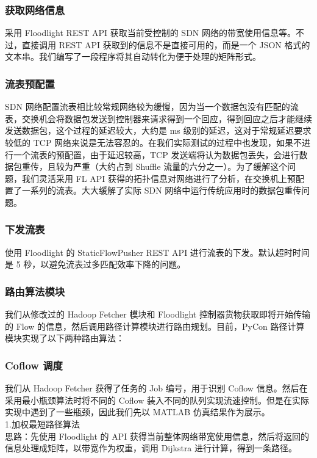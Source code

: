 \documentclass[a4paper, 11pt]{article}                                                   %
\begin{document}
\begin{CJK*}{UTF8}{song}
\subsubsection{获取网络信息}
采用 Floodlight REST API 获取当前受控制的 SDN 网络的带宽使用信息等。不过，直接调用 REST API 获取到的信息不是直接可用的，而是一个 JSON 格式的文本串。我们编写了一段程序将其自动转化为便于处理的矩阵形式。

\subsubsection{流表预配置}
SDN 网络配置流表相比较常规网络较为缓慢，因为当一个数据包没有匹配的流表，交换机会将数据包发送到控制器来请求得到一个回应，得到回应之后才能继续发送数据包，这个过程的延迟较大，大约是 ms 级别的延迟，这对于常规延迟要求较低的 TCP 网络来说是无法容忍的。在我们实际测试的过程中也发现，如果不进行一个流表的预配置，由于延迟较高，TCP 发送端将认为数据包丢失，会进行数据包重传，且较为严重（大约占到 Shuffle 流量的六分之一）。为了缓解这个问题，我们灵活采用 FL API 获得的拓扑信息对网络进行了分析，在交换机上预配置了一系列的流表。大大缓解了实际 SDN 网络中运行传统应用时的数据包重传问题。

\subsubsection{下发流表}
使用 Floodlight 的 StaticFlowPusher REST API 进行流表的下发。默认超时时间是 5 秒，以避免流表过多匹配效率下降的问题。

\subsubsection{路由算法模块}
我们从修改过的 Hadoop Fetcher 模块和 Floodlight 控制器货物获取即将开始传输的 Flow 的信息，然后调用路径计算模块进行路由规划。目前，PyCon 路径计算模块实现了以下两种路由算法：\\

\subsubsection{Coflow 调度}
我们从 Hadoop Fetcher 获得了任务的 Job 编号，用于识别 Coflow 信息。然后在采用最小瓶颈算法时将不同的 Coflow 装入不同的队列实现流速控制。但是在实际实现中遇到了一些瓶颈，因此我们先以 MATLAB 仿真结果作为展示。\\


1.加权最短路径算法\\
思路：先使用 Floodlight 的 API 获得当前整体网络带宽使用信息，然后将返回的信息处理成矩阵，以带宽作为权重，调用 Dijkstra 进行计算，得到一条路径。\\
\bigskip


\end{CJK*}
\end{document}
